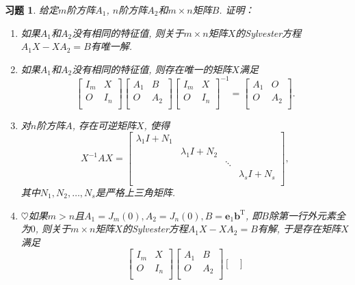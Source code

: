 \documentclass{ctexart}
\newtheorem{exercise}[thm]{习题}
\newcommand\bs[1]{\boldsymbol{ #1}}
\def\hard{$\heartsuit$}
\def\zero{O}
\DeclareMathOperator{\T}{T}
\begin{document}
\begin{exercise}\label{exc:jordan-simplify}
给定$m$阶方阵$A_1$, $n$阶方阵$A_2$和$m\times n$矩阵$B$. 
证明：
\begin{enumerate}
\item 如果$A_1$和$A_2$没有相同的特征值, 则关于$m\times n$矩阵$X$的Sylvester方程$A_1X-XA_2=B$有唯一解. 
\item 如果$A_1$和$A_2$没有相同的特征值, 则存在唯一的矩阵$X$满足
\[
\begin{bmatrix}
I_m & X\\ \zero & I_n\\
\end{bmatrix}\begin{bmatrix}
A_1 & B\\ \zero &A_2\\
\end{bmatrix}\begin{bmatrix}
I_m & X\\ \zero & I_n\\
\end{bmatrix}^{-1}=\begin{bmatrix}
A_1 & \zero\\ \zero &A_2\\
\end{bmatrix}.
\]
\item \label{itm:exc:jordan-simplify:3}
	对$n$阶方阵$A$, 存在可逆矩阵$X$, 使得
\[
X^{-1}AX=\begin{bmatrix}
	\lambda_1I+N_1 &&        &                \\
&\lambda_1I+N_2 &        &                \\
&               & \ddots &                \\
&               &        & \lambda_sI+N_s \\
\end{bmatrix},
\]
其中$N_1,N_2,\dots,N_s$是严格上三角矩阵. 
\item \hard 如果$m>n$且$A_1=J_m(0),A_2=J_n(0),B=\bs e_1\bs b^{\T}$, 即$B$除第一行外元素全为$0$, 则关于$m\times n$矩阵$X$的Sylvester方程$A_1X-XA_2=B$有解, 于是存在矩阵$X$满足
\[
\begin{bmatrix}
I_m & X\\ \zero & I_n\\
\end{bmatrix}\begin{bmatrix}
A_1 & B\\ \zero &A_2\\
\end{bmatrix}\begin{bmatrix}

\end{bmatrix}\]
\end{enumerate}
\end{exercise}
\end{document}
